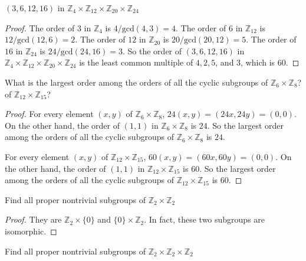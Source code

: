 \begin{exercise}
    $(3,6,12,16)$ in $\mathbb{Z}_{4}\times\mathbb{Z}_{12}\times\mathbb{Z}_{20}\times\mathbb{Z}_{24}$
\end{exercise}

\begin{proof}
    The order of $3$ in $\mathbb{Z}_{4}$ is $4/\text{gcd}(4,3) = 4$. The order of $6$ in $\mathbb{Z}_{12}$ is $12/\text{gcd}(12,6) = 2$. The order of $12$ in $\mathbb{Z}_{20}$ is $20/\text{gcd}(20,12) = 5$. The order of $16$ in $\mathbb{Z}_{24}$ is $24/\text{gcd}(24,16) = 3$. So the order of $(3,6,12,16)$ in $\mathbb{Z}_{4}\times\mathbb{Z}_{12}\times\mathbb{Z}_{20}\times\mathbb{Z}_{24}$ is the least common multiple of $4, 2, 5$, and $3$, which is $60$.
\end{proof}

\begin{exercise}
    What is the largest order among the orders of all the cyclic subgroups of $\mathbb{Z}_{6}\times\mathbb{Z}_{8}$? of $\mathbb{Z}_{12}\times\mathbb{Z}_{15}$?
\end{exercise}

\begin{proof}
    For every element $(x,y)$ of $\mathbb{Z}_{6}\times\mathbb{Z}_{8}$, $24(x,y) = (24x,24y) = (0,0)$. On the other hand, the order of $(1,1)$ in $\mathbb{Z}_{6}\times\mathbb{Z}_{8}$ is $24$. So the largest order among the orders of all the cyclic subgroups of $\mathbb{Z}_{6}\times\mathbb{Z}_{8}$ is $24$.

    For every element $(x,y)$ of $\mathbb{Z}_{12}\times\mathbb{Z}_{15}$, $60(x,y) = (60x,60y) = (0,0)$. On the other hand, the order of $(1,1)$ in $\mathbb{Z}_{12}\times\mathbb{Z}_{15}$ is $60$. So the largest order among the orders of all the cyclic subgroups of $\mathbb{Z}_{12}\times\mathbb{Z}_{15}$ is $60$.
\end{proof}

\begin{exercise}
    Find all proper nontrivial subgroups of $\mathbb{Z}_{2}\times\mathbb{Z}_{2}$
\end{exercise}

\begin{proof}
    They are $\mathbb{Z}_{2}\times\{ 0 \}$ and $\{ 0 \}\times\mathbb{Z}_{2}$. In fact, these two subgroups are isomorphic.
\end{proof}

\begin{exercise}
    Find all proper nontrivial subgroups of $\mathbb{Z}_{2}\times\mathbb{Z}_{2}\times\mathbb{Z}_{2}$
\end{exercise}

